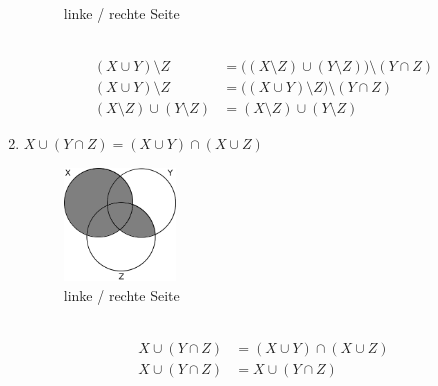 \documentclass[11pt, a4paper]{article}
\begin{document}
\begin{enumerate}
\begin{figure}[h!]
		\caption{linke / rechte Seite}
	\end{figure} \\
	\begin{align*}
		(X \cup Y) \setminus Z &= \Big((X \setminus Z) \cup (Y \setminus Z)\Big) \setminus (Y \cap Z) \\
		(X \cup Y) \setminus Z &= \Big( (X \cup Y) \setminus Z \Big) \setminus (Y \cap Z) \\
		(X \setminus Z) \cup (Y \setminus Z) &= (X \setminus Z) \cup (Y \setminus Z)
	\end{align*}
	\item $X \cup (Y \cap Z) = (X \cup Y) \cap (X \cup Z)$
	\begin{figure}[h!]
		\centering
		\includegraphics[height=3cm]{MengenlehreAufgabe3}
		\caption{linke / rechte Seite}
	\end{figure} \\
	\begin{align*}
		X \cup (Y \cap Z) &= (X \cup Y) \cap (X \cup Z) \\
		X \cup (Y \cap Z) &= X \cup (Y \cap Z) \tag{Distributivitätsgesetz}
	\end{align*}
\end{enumerate}
\end{document}
